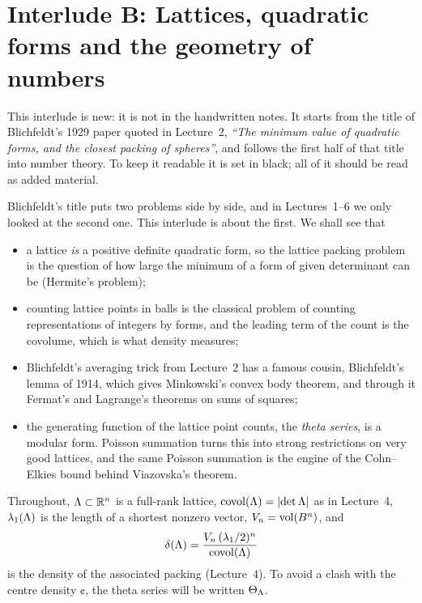 
\chapter[Interlude B: Number theory]{Interlude B: Lattices, quadratic forms and the geometry of numbers}
\label{NT:ch}

\begin{addedblock}
This interlude is new: it is not in the handwritten notes. It starts from the title of Blichfeldt's
1929 paper quoted in Lecture~2, \emph{``The minimum value of quadratic forms, and the closest packing of
spheres''}, and follows the first half of that title into number theory. To keep it readable it is set
in black; all of it should be read as added material.
\end{addedblock}

Blichfeldt's title puts two problems side by side, and in Lectures~1--6 we only looked at the second
one. This interlude is about the first. We shall see that
\begin{itemize}
\item a lattice \emph{is} a positive definite quadratic form, so the lattice packing problem is the
  question of how large the minimum of a form of given determinant can be (Hermite's problem);
\item counting lattice points in balls is the classical problem of counting representations of integers
  by forms, and the leading term of the count is the covolume, which is what density measures;
\item Blichfeldt's averaging trick from Lecture~2 has a famous cousin, Blichfeldt's lemma of 1914, which
  gives Minkowski's convex body theorem, and through it Fermat's and Lagrange's theorems on sums of squares;
\item the generating function of the lattice point counts, the \emph{theta series}, is a modular form.
  Poisson summation turns this into strong restrictions on very good lattices, and the same Poisson
  summation is the engine of the Cohn--Elkies bound behind Viazovska's theorem.
\end{itemize}
Throughout, $\Lambda\subset\mathbb{R}^n$ is a full-rank lattice, $\operatorname{covol}(\Lambda)=\left\lvert \det\Lambda \right\rvert$ as in Lecture~4,
$\lambda_1(\Lambda)$ is the length of a shortest nonzero vector, $V_n=\operatorname{vol}(B^n)$, and
\[
  \delta(\Lambda)=\frac{V_n\,(\lambda_1/2)^n}{\operatorname{covol}(\Lambda)}
\]
is the density of the associated packing (Lecture~4). To avoid a clash with the centre density
$\cent$, the theta series will be written $\Theta_\Lambda$.

